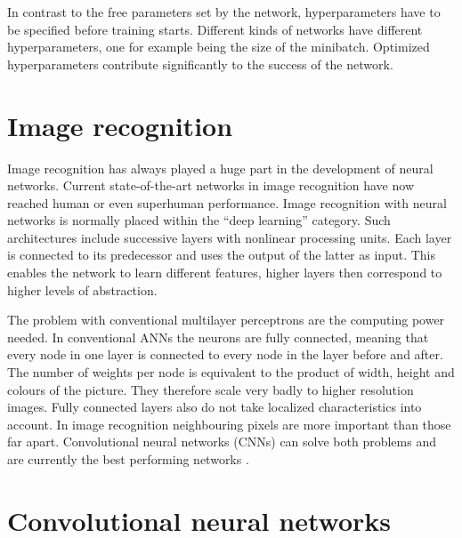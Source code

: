 In contrast to the free parameters set by the network, hyperparameters have to be specified before training starts. Different kinds of networks have different hyperparameters, one for example being the size of the minibatch. Optimized hyperparameters contribute significantly to the success of the network. \cite{Bishop2016}


\section{Image recognition}
Image recognition has always played a huge part in the development of neural networks. Current state-of-the-art networks in image recognition have now reached human or even superhuman performance. Image recognition with neural networks is normally placed within the \enquote{deep learning} category. Such architectures include successive layers with nonlinear processing units. Each layer is connected to its predecessor and uses the output of the latter as input. This enables the network to learn different features, higher layers then correspond to higher levels of abstraction. 

 The problem with conventional multilayer perceptrons are the computing power needed. In conventional ANNs the neurons are fully connected, meaning that every node in one layer is connected to every node in the layer before and after. The number of weights per node is equivalent to the product of width, height and colours of the picture. They therefore scale very badly to higher resolution images. Fully connected layers also do not take localized characteristics into account. In image recognition neighbouring pixels are more important than those far apart.
Convolutional neural networks (CNNs) can solve both problems and are currently the best performing networks \cite{imagenet}.



\section{Convolutional neural networks}

